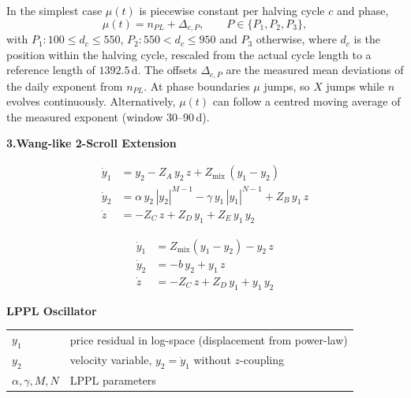 \documentclass[11pt,a4paper]{article}
\begin{document}
\smallskip
{}
{\color{fg}\small In the simplest case $\mu(t)$ is piecewise constant per halving cycle $c$ and phase,
\[
  \mu(t) = n_{PL} + \Delta_{c,P},\qquad P\in\{P_1,P_2,P_3\},
\]
with $P_1\!: 100 \le d_c \le 550$, $P_2\!: 550 < d_c \le 950$ and $P_3$ otherwise, where $d_c$ is the
position within the halving cycle, rescaled from the actual cycle length to a reference length of
$1392.5$\,d. The offsets $\Delta_{c,P}$ are the measured mean deviations of the daily exponent from
$n_{PL}$. At phase boundaries $\mu$ jumps, so $X$ jumps while $n$ evolves continuously.
Alternatively, $\mu(t)$ can follow a centred moving average of the measured exponent
(window 30--90\,d).}

\medskip

\noindent\textbf{\color{cwang}3.\;Wang-like 2-Scroll Extension}

\begin{align}
  \dot{y}_1 &= y_2 - Z_A\,y_2\,z + Z_{\mathrm{mix}}\,(y_1 - y_2) \\[4pt]
  \dot{y}_2 &= \alpha\,y_2\,|y_2|^{M-1} - \gamma\,y_1\,|y_1|^{N-1} + Z_B\,y_1\,z \\[4pt]
  \dot{z}   &= -Z_C\,z + Z_D\,y_1 + Z_E\,y_1\,y_2
\end{align}


\smallskip\smallskip
\noindent{\color{muted}\rule{\linewidth}{0.4pt}}

\begin{align}
  \dot{y}_1 &= Z_{\mathrm{mix}}(y_1 - y_2) - y_2\,z \\[4pt]
  \dot{y}_2 &= -b\,y_2 + y_1\,z \\[4pt]
  \dot{z}   &= -Z_C\,z + Z_D\,y_1 + y_1\,y_2
\end{align}

\smallskip

\bigskip

\noindent{\color{muted}\rule{\linewidth}{0.4pt}}

\smallskip

\noindent\textbf{\color{accent}LPPL Oscillator}

\smallskip\noindent
\begin{tabular}{@{}ll@{}}
  $y_1$             & price residual in log-space (displacement from power-law) \\[2pt]
  $y_2$             & velocity variable, $y_2 = \dot{y}_1$ without $z$-coupling \\[2pt]
  $\alpha,\gamma,M,N$ & LPPL parameters \\
\end{tabular}
\end{document}
